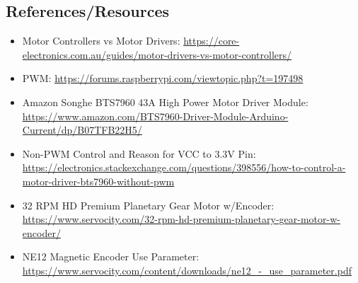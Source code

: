 \documentclass[a4paper, 10pt]{article}
\begin{document}
    \subsection{References/Resources}
    \begin{itemize}
        \item Motor Controllers vs Motor Drivers: \url{https://core-electronics.com.au/guides/motor-drivers-vs-motor-controllers/}
        \item PWM: \url{https://forums.raspberrypi.com/viewtopic.php?t=197498}
        \item Amazon Songhe BTS7960 43A High Power Motor Driver Module: \\
        \url{https://www.amazon.com/BTS7960-Driver-Module-Arduino-Current/dp/B07TFB22H5/}
        \item Non-PWM Control and Reason for VCC to 3.3V Pin: \\ \url{https://electronics.stackexchange.com/questions/398556/how-to-control-a-motor-driver-bts7960-without-pwm}
        \item 32 RPM HD Premium Planetary Gear Motor w/Encoder: \url{https://www.servocity.com/32-rpm-hd-premium-planetary-gear-motor-w-encoder/}
        \item NE12 Magnetic Encoder Use Parameter: \\ \url{https://www.servocity.com/content/downloads/ne12_-_use_parameter.pdf}

    \end{itemize}
\end{document}
